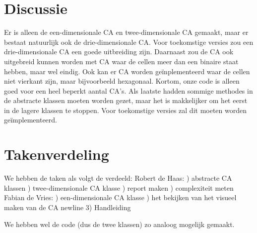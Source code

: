 \documentclass[12pt,a4paper]{article}
\begin{document}
\section*{Discussie}
Er is alleen de een-dimensionale CA en twee-dimensionale 
CA gemaakt, maar er bestaat natuurlijk ook de drie-dimensionale CA.
Voor toekomstige versies zou een drie-dimensionale CA een goede uitbreiding zijn.
Daarnaast zou de CA ook uitgebreid kunnen worden met CA waar de cellen meer dan een binaire staat hebben, maar wel eindig.
Ook kan er CA worden geïnplementeerd waar de cellen niet vierkant zijn, maar bijvoorbeeld hexagonaal.
Kortom, onze code is alleen goed voor een heel beperkt aantal CA's.
Als laatste hadden sommige methodes in de abstracte klassen moeten worden gezet, maar het 
is makkelijker om het eerst in de lagere klassen te stoppen.
Voor toekomstige versies zal dit moeten worden geïmplementeerd.  

\newpage
\section*{Takenverdeling}
We hebben de taken als volgt de verdeeld:
\vspace{6pt}
\newline
Robert de Haas:
) abstracte CA klassen
) twee-dimensionale CA klasse
) report maken
) complexiteit meten
\vspace{6pt}
\newline
Fabian de Vries:
) een-dimensionale CA klasse
) het bekijken van het visueel maken van de CA
newline
3) Handleiding 


We hebben wel de code (dus de twee klassen) zo analoog mogelijk gemaakt.

  
\end{document}
